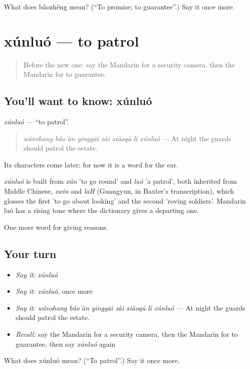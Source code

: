 \begin{tcolorbox}[breakable,colback=teal!4,colframe=teal!35!black,title={Before you move on}]
What does bǎozhèng mean? (\textquotedblleft{}To promise; to guarantee\textquotedblright{}.) Say it once more.
\end{tcolorbox}
\section[xúnluó]{xúnluó — to patrol}

\label{lesson:ZH-C382-xunluo}



\begin{quote}
Before the new one: say the Mandarin for a security camera, then the Mandarin for to guarantee.
\end{quote}

\subsection*{You'll want to know: xúnluó}
\emph{xúnluó} — \textquotedblleft{}to patrol\textquotedblright{}.

\begin{quote}
\emph{wǎnshang bǎo'ān yīnggāi zài xiǎoqū lǐ xúnluó} — At night the guards should patrol the estate.
\end{quote}

Its characters come later; for now it is a word for the ear.

\begin{cousinweb}
\emph{xúnluó} is built from \emph{xún} 'to go round' and \emph{luó} 'a patrol', both inherited from Middle Chinese, \emph{zwin} and \emph{laH} (Guangyun, in Baxter's transcription), which glosses the first 'to go about looking' and the second 'roving soldiers'. Mandarin luó has a rising tone where the dictionary gives a departing one.
\end{cousinweb}

\begin{grammarlens}[title={What you've built}]
One more word for giving reasons.
\end{grammarlens}

\subsection*{Your turn}
\begin{itemize}
\raggedright
  \item \emph{Say it:} \emph{xúnluó}
  \item \emph{Say it:} \emph{xúnluó}, once more
  \item \emph{Say it:} \emph{wǎnshang bǎo'ān yīnggāi zài xiǎoqū lǐ xúnluó} — At night the guards should patrol the estate.
  \item \emph{Recall:} say the Mandarin for a security camera, then the Mandarin for to guarantee, then say \emph{xúnluó} again
\end{itemize}

\begin{tcolorbox}[breakable,colback=teal!4,colframe=teal!35!black,title={Before you move on}]
What does xúnluó mean? (\textquotedblleft{}To patrol\textquotedblright{}.) Say it once more.
\end{tcolorbox}
